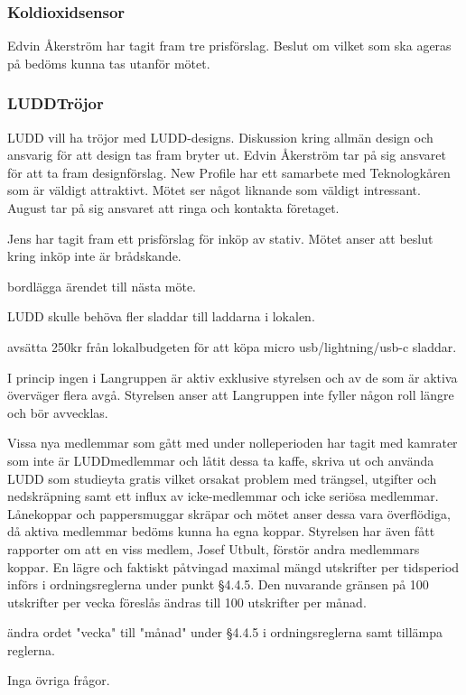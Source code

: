 \documentclass{protokoll}
\begin{document}
\subsubsection{Koldioxidsensor}
Edvin Åkerström har tagit fram tre prisförslag. Beslut om vilket som ska ageras på bedöms kunna tas utanför mötet. 

\subsubsection{LUDDTröjor}
LUDD vill ha tröjor med LUDD-designs. Diskussion kring allmän design och ansvarig för att design tas fram bryter ut. 
Edvin Åkerström tar på sig ansvaret för att ta fram designförslag. 
New Profile har ett samarbete med Teknologkåren som är väldigt attraktivt. Mötet ser något liknande som väldigt intressant.
August tar på sig ansvaret att ringa och kontakta företaget.

Jens har tagit fram ett prisförslag för inköp av stativ. Mötet anser att beslut kring inköp inte är brådskande. 
\begin{beslut}
    \att bordlägga ärendet till nästa möte.
\end{beslut}
LUDD skulle behöva fler sladdar till laddarna i lokalen. 
\begin{beslut}
    \att avsätta 250kr från lokalbudgeten för att köpa micro usb/lightning/usb-c sladdar.
\end{beslut}

I princip ingen i Langruppen är aktiv exklusive styrelsen och av de som är aktiva överväger flera avgå.
Styrelsen anser att Langruppen inte fyller någon roll längre och bör avvecklas.

Vissa nya medlemmar som gått med under nolleperioden har tagit med kamrater som inte är LUDDmedlemmar och låtit dessa ta kaffe, skriva ut och använda LUDD som studieyta gratis vilket orsakat problem med trängsel, utgifter och nedskräpning samt ett influx av icke-medlemmar och icke seriösa medlemmar. 
Lånekoppar och pappersmuggar skräpar och mötet anser dessa vara överflödiga, då aktiva medlemmar bedöms kunna ha egna koppar. Styrelsen har även fått rapporter om att en viss medlem, Josef Utbult, förstör andra medlemmars koppar.
En lägre och faktiskt påtvingad maximal mängd utskrifter per tidsperiod införs i ordningsreglerna under punkt §4.4.5. Den nuvarande gränsen på 100 utskrifter per vecka föreslås ändras till 100 utskrifter per månad. 
\begin{beslut}
    \att ändra ordet "vecka" till "månad" under §4.4.5 i ordningsreglerna samt tillämpa reglerna.
\end{beslut}
Inga övriga frågor.
\end{document}
